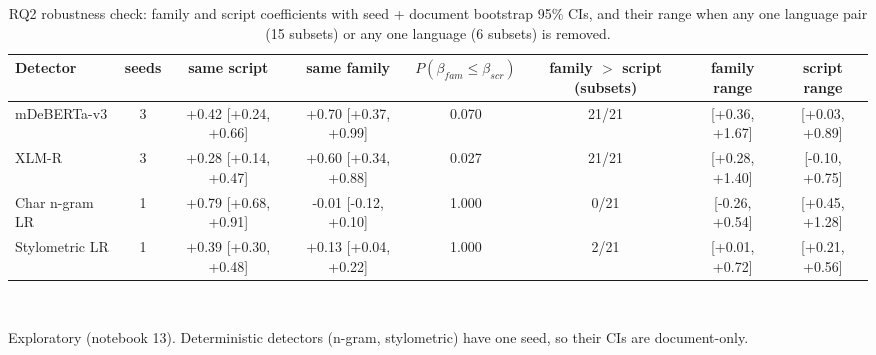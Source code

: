 \begin{table}[t]
\centering
\small
\caption{RQ2 robustness check: family and script coefficients with seed + document bootstrap 95\% CIs, and their range when any one language pair (15 subsets) or any one language (6 subsets) is removed.}
\label{tab:rq2seed}
\begin{tabular}{lccccccc}
\toprule
Detector & seeds & same script & same family & $P(\beta_{fam}\le\beta_{scr})$ & family $>$ script (subsets) & family range & script range \\
\midrule
mDeBERTa-v3 & 3 & +0.42 [+0.24, +0.66] & +0.70 [+0.37, +0.99] & 0.070 & 21/21 & [+0.36, +1.67] & [+0.03, +0.89] \\
XLM-R & 3 & +0.28 [+0.14, +0.47] & +0.60 [+0.34, +0.88] & 0.027 & 21/21 & [+0.28, +1.40] & [-0.10, +0.75] \\
Char n-gram LR & 1 & +0.79 [+0.68, +0.91] & -0.01 [-0.12, +0.10] & 1.000 & 0/21 & [-0.26, +0.54] & [+0.45, +1.28] \\
Stylometric LR & 1 & +0.39 [+0.30, +0.48] & +0.13 [+0.04, +0.22] & 1.000 & 2/21 & [+0.01, +0.72] & [+0.21, +0.56] \\
\bottomrule
\end{tabular}
\\[2pt]\parbox{\linewidth}{\footnotesize Exploratory (notebook 13). Deterministic detectors (n-gram, stylometric) have one seed, so their CIs are document-only.}
\end{table}